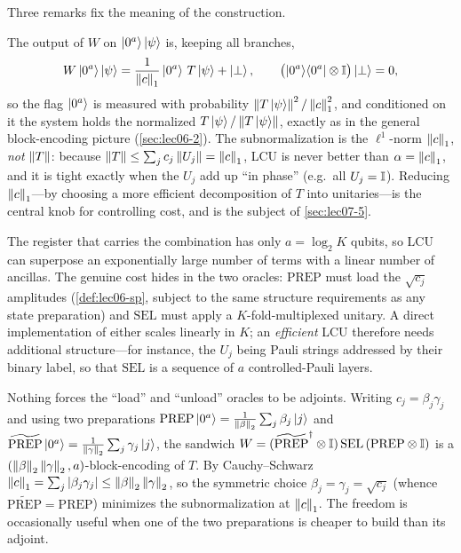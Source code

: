 Three remarks fix the meaning of the construction.

\begin{remark}
\label{rem:lec07-read}
The output of $W$ on $\ket{0^a}\ket{\psi}$ is, keeping all branches,
\begin{equation}
  W\ket{0^a}\ket{\psi}
  =\frac{1}{\left\lVert c \right\rVert_1}\ket{0^a}\,T\ket{\psi}+\ket{\perp},
  \qquad \bigl(\ket{0^a}\!\bra{0^a}\otimes\mathbb{I}\bigr)\ket{\perp}=0,
  \label{eq:lec07-output}
\end{equation}
so the flag $\ket{0^a}$ is measured with probability
$\left\lVert T\ket{\psi} \right\rVert^2/\left\lVert c \right\rVert_1^2$, and conditioned on it the system holds the
normalized $T\ket{\psi}/\left\lVert T\ket{\psi} \right\rVert$, exactly as in the general
block-encoding picture (\cref{sec:lec06-2}). The subnormalization is the
$\ell^1$-norm $\left\lVert c \right\rVert_1$, \emph{not} $\left\lVert T \right\rVert$: because
$\left\lVert T \right\rVert\le\sum_j c_j\left\lVert U_j \right\rVert=\left\lVert c \right\rVert_1$, LCU is never better than
$\alpha=\left\lVert c \right\rVert_1$, and it is tight exactly when the $U_j$ add up ``in phase''
(e.g.\ all $U_j=\mathbb{I}$). Reducing $\left\lVert c \right\rVert_1$---by choosing a more efficient
decomposition of $T$ into unitaries---is the central knob for controlling cost, and
is the subject of \cref{sec:lec07-5}.
\end{remark}

\begin{remark}
\label{rem:lec07-log}
The register that carries the combination has only $a=\log_2 K$ qubits, so LCU can
superpose an exponentially large number of terms with a linear number of ancillas.
The genuine cost hides in the two oracles: $\mathrm{PREP}$ must load the
$\sqrt{c_j}$ amplitudes (\cref{def:lec06-sp}, subject to the same structure
requirements as any state preparation) and $\mathrm{SEL}$ must apply a
$K$-fold-multiplexed unitary. A direct implementation of either scales linearly in
$K$; an \emph{efficient} LCU therefore needs additional structure---for instance,
the $U_j$ being Pauli strings addressed by their binary label, so that $\mathrm{SEL}$
is a sequence of $a$ controlled-Pauli layers.
\end{remark}

\begin{remark}
\label{rem:lec07-split}
Nothing forces the ``load'' and ``unload'' oracles to be adjoints. Writing
$c_j=\beta_j\gamma_j$ and using two preparations
$\mathrm{PREP}\ket{0^a}=\frac{1}{\left\lVert \beta \right\rVert_2}\sum_j\beta_j\ket{j}$ and
$\widetilde{\mathrm{PREP}}\ket{0^a}=\frac{1}{\left\lVert \gamma \right\rVert_2}\sum_j\gamma_j\ket{j}$,
the sandwich $W=(\widetilde{\mathrm{PREP}}^{\dagger}\otimes\mathbb{I})\,\mathrm{SEL}\,
(\mathrm{PREP}\otimes\mathbb{I})$ is a $(\left\lVert \beta \right\rVert_2\left\lVert \gamma \right\rVert_2,a)$-block-encoding of
$T$. By Cauchy--Schwarz $\left\lVert c \right\rVert_1=\sum_j\left\lvert \beta_j\gamma_j \right\rvert\le
\left\lVert \beta \right\rVert_2\left\lVert \gamma \right\rVert_2$, so the symmetric choice
$\beta_j=\gamma_j=\sqrt{c_j}$ (whence
$\widetilde{\mathrm{PREP}}=\mathrm{PREP}$) minimizes the subnormalization at
$\left\lVert c \right\rVert_1$. The freedom is occasionally useful when one of the two preparations is
cheaper to build than its adjoint.
\end{remark}

